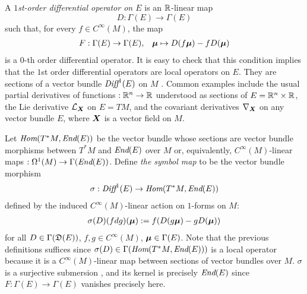 A \emph{$1$st-order differential operator on $E$} is an $\mathbb{R}$-linear map 
\[
    D: \Gamma(E) \to \Gamma(E)
\]
such that, for every $f \in C^\infty(M)$, the map
\begin{align*}
    F: \Gamma(E) \to \Gamma(E), && \bm{\mu} \mapsto D(f \bm{\mu}) - f D(\bm{\mu})
\end{align*}
is a $0$-th order differential operator. It is easy to check that this condition implies that the $1$st order differential operators are local operators on $E$. They are sections of a vector bundle $\operatorname{\textit{Diff}}^1(E)$ on $M$ \cite{Mackenzie2005}%
. Common examples include the usual partial derivatives of functions $:\mathbb{R}^n \to \mathbb{R}$ understood as sections of $E = \mathbb{R}^n \times \mathbb{R}$, the Lie derivative $\mathcal L_{\bm{X}}$ on $E = TM$, and the covariant derivatives $\nabla_{\bm{X}}$ on any vector bundle $E$, where $\bm{X}$ is a vector field on $M$.

Let $\operatorname{\textit{Hom}}(T^*M, \operatorname{\textit{End}}(E))$ be the vector bundle whose sections are vector bundle morphisms between $T^* M$ and $\operatorname{\textit{End}}(E)$ over $M$ or, equivalently, $C^\infty(M)$-linear maps $:\Omega^1(M) \to \Gamma(\operatorname{\textit{End}}(E))$. Define \emph{the symbol map} to be the vector bundle morphism
\begin{align*}
    \sigma: \operatorname{\textit{Diff}}^1(E) \to \operatorname{\textit{Hom}}(T^*M, \operatorname{\textit{End}}(E)) 
\end{align*}
defined by the induced $C^\infty(M)$-linear action on $1$-forms on $M$:
\begin{align*}
    \sigma(D)(fdg)(\bm{\mu}) := f (D(g \bm{\mu}) - g D(\bm{\mu}))
\end{align*}
for all $D \in \Gamma(\mathfrak{D}(E))$, $f, g \in C^\infty(M)$, $\bm{\mu} \in \Gamma(E)$.
Note that the previous definitions suffices since $\sigma(D) \in \Gamma(\operatorname{\textit{Hom}}(T^*M, \operatorname{\textit{End}}(E)))$ is a local operator because it is a $C^\infty(M)$-linear map between sections of vector bundles over $M$. $\sigma$ is a surjective submersion \cite{Mackenzie2005}, and its kernel is precisely $\operatorname{\textit{End}}(E)$ since $F:\Gamma(E) \to \Gamma(E)$ vanishes precisely here.

